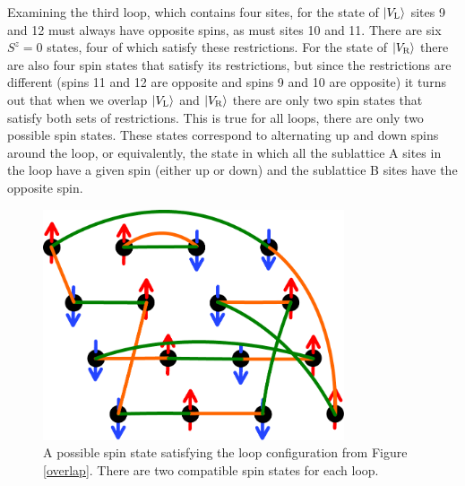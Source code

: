 Examining the third loop, which contains four sites, for the state of $\lvert {V_\text{L}} \rangle$ sites 9 and 12 must always have opposite spins, as must sites 10 and 11.  There are six $S^z=0$ states, four of which satisfy these restrictions.  For the state of $\lvert {V_\text{R}} \rangle$ there are also four spin states that satisfy its restrictions, but since the restrictions are different (spins 11 and 12 are opposite and spins 9 and 10 are opposite) it turns out that when we overlap $\lvert {V_\text{L}} \rangle$ and $\lvert {V_\text{R}} \rangle$ there are only two spin states that satisfy both sets of restrictions.  This is true for all loops, there are only two possible spin states.  These states correspond to alternating up and down spins around the loop, or equivalently, the state in which all the sublattice A sites in the loop have a given spin (either up or down) and the sublattice B sites have the opposite spin.  

\begin{figure} { \includegraphics [width=3.5in]
{./figures/made/spinstate.pdf}
\centering
 \caption[A possible spin state for a given set of valence bonds]{
	A possible spin state satisfying the loop configuration from Figure \ref{overlap}.  There are two compatible spin states for each loop. }
\label{spinstate}
}
\end{figure}

